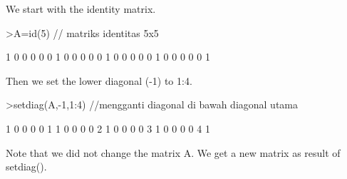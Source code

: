\documentclass{article}
\begin{document}
\begin{eulernotebook}
\begin{eulercomment}
\begin{eulercomment}
\begin{eulercomment}
\begin{eulercomment}
\begin{eulercomment}
\begin{eulercomment}
\begin{eulercomment}
We start with the identity matrix.
\end{eulercomment}
\begin{eulerprompt}
>A=id(5) // matriks identitas 5x5
\end{eulerprompt}
\begin{euleroutput}
              1             0             0             0             0 
              0             1             0             0             0 
              0             0             1             0             0 
              0             0             0             1             0 
              0             0             0             0             1 
\end{euleroutput}
\begin{eulercomment}
Then we set the lower diagonal (-1) to 1:4.
\end{eulercomment}
\begin{eulerprompt}
>setdiag(A,-1,1:4) //mengganti diagonal di bawah diagonal utama
\end{eulerprompt}
\begin{euleroutput}
              1             0             0             0             0 
              1             1             0             0             0 
              0             2             1             0             0 
              0             0             3             1             0 
              0             0             0             4             1 
\end{euleroutput}
\begin{eulercomment}
Note that we did not change the matrix A. We get a new matrix as
result of setdiag().


\end{eulercomment}
\end{eulercomment}
\end{eulercomment}
\end{eulercomment}
\end{eulercomment}
\end{eulercomment}
\end{eulercomment}
\end{eulernotebook}
\end{document}
